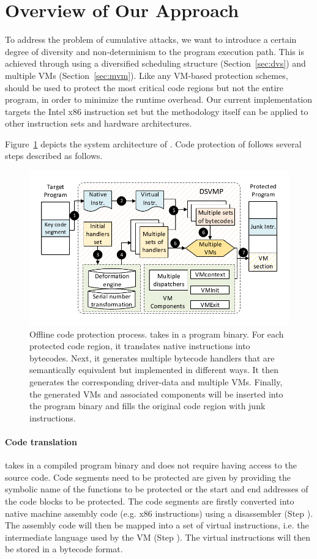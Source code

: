 \section{Overview of Our Approach}\label{sec:overview}
To address the problem of cumulative attacks, we want to introduce a certain
degree of diversity and non-determinism to the program execution path. This is achieved
through using a diversified scheduling structure (Section~\ref {sec:dvs}) and
multiple VMs (Section~\ref {sec:mvm}). Like any VM-based protection schemes,
\DSVMP should be used to protect the most critical code regions but not the entire program, in order to minimize the runtime overhead.
Our current implementation targets the Intel x86 instruction set but the methodology itself can be
applied to other instruction sets and hardware architectures.


Figure~\ref{fig:Fig.overview} depicts the system architecture of \DSVMP.
Code protection of \DSVMP follows several steps described as follows.

\begin{figure}[!t]
  \centering
  \includegraphics[width=0.7\columnwidth]{figure/figoverview.pdf}
  \caption{Offline code protection process. \DSVMP takes in a program binary. For each protected code region, it translates native instructions into bytecodes. Next, it generates multiple bytecode handlers that are semantically equivalent but implemented in different ways. It then generates the corresponding driver-data and multiple VMs. Finally, the generated VMs and associated components will be inserted into the program binary and fills the original code region with junk instructions.}\label{fig:Fig.overview}
\end{figure}

\paragraph*{Code translation} \DSVMP takes in a compiled program binary and
does not require having access to the source code. Code segments need to be
protected are given by providing the symbolic name of the functions to be protected or the
 start and end addresses of the code blocks to be protected. The code segments are
firstly converted into native machine assembly code (e.g. x86 instructions)
using a disassembler (Step ). The assembly code will then be mapped into a set of virtual instructions, i.e.
the intermediate language used by the VM (Step ).
The virtual instructions will then be stored in a bytecode format.

